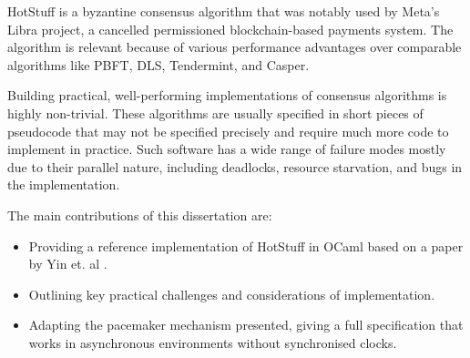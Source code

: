 HotStuff is a byzantine consensus algorithm that was notably used by Meta's Libra project, a cancelled permissioned blockchain-based payments system. The algorithm is relevant because of various performance advantages over comparable algorithms like PBFT, DLS, Tendermint, and Casper.


Building practical, well-performing implementations of consensus algorithms is highly non-trivial. These algorithms are usually specified in short pieces of pseudocode that may not be specified precisely and require much more code to implement in practice. Such software has a wide range of failure modes mostly due to their parallel nature, including deadlocks, resource starvation, and bugs in the implementation. \cite{chubby}

The main contributions of this dissertation are:
\begin{itemize}
	\item Providing a reference implementation of HotStuff in OCaml based on a paper by Yin et. al \cite{yin2019hotstuff}.
	\item Outlining key practical challenges and considerations of implementation.
	\item Adapting the pacemaker mechanism presented, giving a full specification that works in asynchronous environments without synchronised clocks.
\end{itemize}


